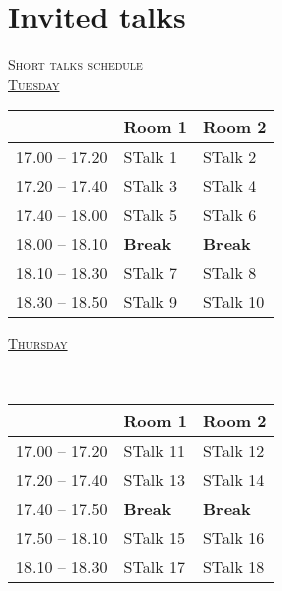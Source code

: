 \documentclass[a4paper]{article}
\begin{document}
\pagebreak
\section{Invited talks}

\pagebreak
\thispagestyle{empty}
	\begin{center}
	\textsc{\LARGE Short talks schedule}\\
	\vspace{0.5cm}
	\hypertarget{short1}{\textsc{\Large\hyperlink{bS1}{Tuesday }}}\\ %
	\end{center}
	\begin{table}[htbp]
		\centering
		\begin{tabularx}{\textwidth}{| c | X | X |}
			\hline
	     & \textbf{Room 1}     & \textbf{Room 2}\\ \hline
17.00 -- 17.20    & {STalk 1} & {STalk 2}  \\ \hline
17.20 -- 17.40     & {STalk 3} & {STalk 4} \\ \hline
17.40 -- 18.00 &  {STalk 5} & {STalk 6} \\ \hline
18.00 -- 18.10 & \textbf{Break} & \textbf{Break} \\ \hline
18.10 -- 18.30 & {STalk 7} & {STalk 8} \\ \hline
18.30 -- 18.50 & {STalk 9} & {STalk 10}  \\ \hline
		\end{tabularx}
		\end{table}
		\begin{center}
			\hypertarget{short2}{\textsc{\Large\hyperlink{bS2}{Thursday}}}\\ %
		\end{center}
		\begin{table}[htbp]
		\centering
		\begin{tabularx}{\textwidth}{| c | X | X |}
			\hline
	     & \textbf{Room 1}     & \textbf{Room 2} \\ \hline
17.00 -- 17.20    & {STalk 11} & {STalk 12}  \\ \hline
17.20 -- 17.40     & {STalk 13}  & {STalk 14} \\ \hline
17.40 -- 17.50 & \textbf{Break} & \textbf{Break} \\ \hline
17.50 -- 18.10 &  {STalk 15}& {STalk 16}  \\ \hline
18.10 -- 18.30 & {STalk 17}  & {STalk 18}  \\ \hline
		\end{tabularx}
		
	\end{table}
\end{document}
